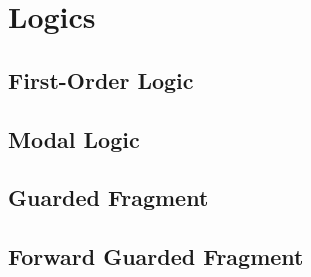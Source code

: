 \chapter{Logics}\label{chap:logics}


\section{First-Order Logic}\label{sec:first-order-logic}



\section{Modal Logic}

\section{Guarded Fragment}
\section{Forward Guarded Fragment}
